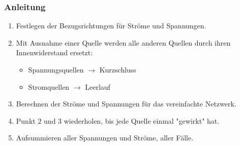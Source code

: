 \subsubsection*{Anleitung}
\begin{enumerate}
    \item Festlegen der Bezugsrichtungen für Ströme und Spannungen.
    \item Mit Ausnahme einer Quelle werden alle anderen Quellen durch ihren Innenwiderstand ersetzt:
    \begin{itemize}
        \item Spannungsquellen $\rightarrow$ Kurzschluss
        \item Stromquellen $\rightarrow$ Leerlauf
    \end{itemize}
    \item Berechnen der Ströme und Spannungen für das vereinfachte Netzwerk.
    \item Punkt $2$ und $3$ wiederholen, bis jede Quelle einmal "gewirkt" hat.
    \item Aufsummieren aller Spannungen und Ströme, aller Fälle. 
\end{enumerate}

